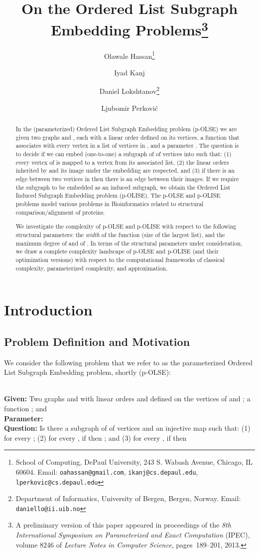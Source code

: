 \documentclass[11pt]{article}
\date{}
\title{On the Ordered List Subgraph Embedding Problems\footnote{A preliminary version of this paper appeared in proceedings of the {\em 8th International Symposium on Parameterized and Exact Computation} (IPEC), volume 8246 of {\em Lecture Notes in Computer Science}, pages~189--201, 2013.}}
\author{
{\sc Olawale Hassan}\footnote{School of
Computing, DePaul University, 243 S. Wabash Avenue, Chicago, IL
60604. Email: {\tt oahassan@gmail.com}, {\tt ikanj@cs.depaul.edu}, {\tt lperkovic@cs.depaul.edu}}
\and
{\sc Iyad Kanj}\footnotemark[2]
\and
{\sc Daniel Lokshtanov}\thanks{Department of Informatics,
University of Bergen, Bergen, Norway.  Email: {\tt daniello@ii.uib.no}}
\and
{\sc Ljubomir Perkovi\'{c}}\footnotemark[2]
}
\newcommand{\paramproblem}[4]{\noindent {\sc #1}
\\
{\bf Given:} #2\\
{\bf Parameter:} #3\\
{\bf Question:} #4}
\begin{document}
\maketitle

\begin{abstract}
In the (parameterized) {\sc Ordered List Subgraph Embedding} problem (p-OLSE) we are given two graphs  and , each with a linear order defined on its vertices, a function  that associates with every vertex in  a list of vertices in , and a parameter . The question is to decide if we can embed (one-to-one) a subgraph  of  of  vertices into  such that: (1) every vertex of  is mapped to a vertex from its associated list, (2) the linear orders inherited by  and its image under the embedding are respected, and (3) if there is an edge between two vertices in  then there is an edge between their images. If we require the subgraph  to be embedded as an induced subgraph, we obtain the {\sc Ordered List Induced Subgraph Embedding} problem (p-OLISE). The p-OLSE and p-OLISE problems model various problems in Bioinformatics related to structural comparison/alignment of proteins.

We investigate the complexity of p-OLSE and p-OLISE with respect to the following structural parameters: the {\em width}  of the function  (size of the largest list), and the maximum degree  of  and  of . In terms of the structural parameters under consideration, we draw a complete complexity landscape of p-OLSE and p-OLISE (and their optimization versions) with respect to the computational frameworks of classical complexity, parameterized complexity, and approximation.
\end{abstract}


\section{Introduction} \label{sec:intro}
\subsection{Problem Definition and Motivation}
\label{subsec:motivation}
We consider the following problem that we refer to as the parameterized {\sc Ordered List Subgraph Embedding} problem, shortly (p-OLSE):

\paramproblem{} {Two graphs  and  with linear orders  and  defined on the vertices of  and ; a function ; and }{}{Is there a subgraph  of  of  vertices and an injective map  such that: (1)  for every ; (2) for every , if  then ; and (3) for every , if  then } \\
\end{document}

